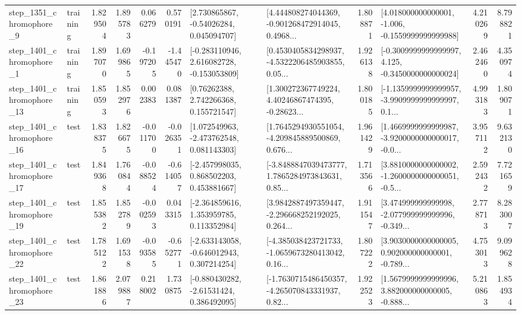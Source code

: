 \begin{tabular}{llrrrrllrlrr}
  step\_1351\_chromophore\_9 &  training &      1.829504 &    1.895783 &      0.066279 &  0.570191 &     [2.730865867, -0.54026284, 0.045094707] &  [4.444808274044369, -0.901268472914045, 0.4968... &       1.808871 &   [4.018000000000001, -1.006, -0.1559999999999988] &            4.210269 &          8.798821 \\
  step\_1401\_chromophore\_1 &  training &      1.897070 &    1.699865 &     -0.197205 & -1.445470 &   [-0.283110946, 2.616082728, -0.153053809] &  [0.4530405834298937, -4.5322206485903855, 0.05... &       1.926138 &  [-0.3009999999999997, 4.125, -0.3450000000000024] &            2.462460 &          4.350974 \\
 step\_1401\_chromophore\_13 &  training &      1.850593 &    1.852976 &      0.002383 &  0.081387 &      [0.76262388, 2.742266368, 0.155721547] &  [1.300272367749224, 4.40246867474395, -0.28623... &       1.800185 &  [-1.1359999999999957, -3.9909999999999997, 0.1... &            4.993183 &          1.809071 \\
 step\_1401\_chromophore\_16 &      test &      1.838375 &    1.826675 &     -0.011700 & -0.026351 &    [1.072549963, -2.473762548, 0.081143303] &  [1.7645294930551054, -4.209845889500869, 0.676... &       1.961429 &  [1.4669999999999987, -3.9200000000000017, -0.0... &            3.957112 &          9.632130 \\
 step\_1401\_chromophore\_17 &      test &      1.849368 &    1.760844 &     -0.088524 & -0.614057 &    [-2.457998035, 0.868502203, 0.453881667] &  [-3.8488847039473777, 1.7865284973843631, 0.85... &       1.713566 &  [3.8810000000000002, -1.2600000000000051, -0.5... &            2.592432 &          7.721659 \\
 step\_1401\_chromophore\_19 &      test &      1.855382 &    1.852789 &     -0.002593 &  0.043315 &    [-2.364859616, 1.353959785, 0.113352984] &  [3.9842887497359447, -2.296668252192025, 0.264... &       1.911547 &  [3.474999999999998, -2.077999999999996, -0.349... &            2.778713 &          8.283007 \\
 step\_1401\_chromophore\_22 &      test &      1.785122 &    1.691538 &     -0.093585 & -0.652771 &   [-2.633143058, -0.646012943, 0.307214254] &  [-4.385038423721733, -1.0659673280413042, 0.16... &       1.807222 &  [3.9030000000000005, 0.902000000000001, -0.789... &            4.753013 &          9.099628 \\
 step\_1401\_chromophore\_23 &      test &      1.861886 &    2.079887 &      0.218002 &  1.730875 &    [-0.880430282, -2.61531424, 0.386492095] &  [-1.7630715486450357, -4.265070843331937, 0.82... &       1.922523 &  [1.5679999999999996, 3.882000000000005, -0.888... &            5.210863 &          1.854934 \\

\end{tabular}

